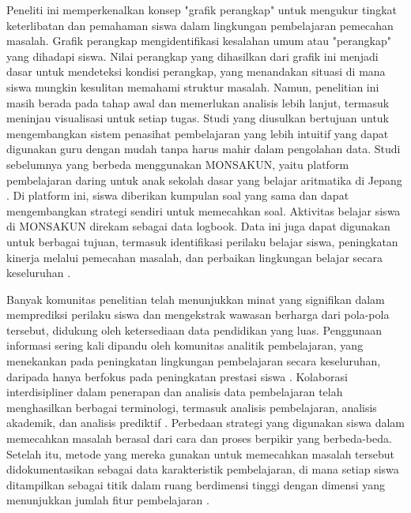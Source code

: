     Peneliti ini memperkenalkan konsep "grafik perangkap" untuk mengukur tingkat keterlibatan dan pemahaman siswa dalam lingkungan pembelajaran pemecahan masalah. Grafik perangkap mengidentifikasi kesalahan umum atau "perangkap" yang dihadapi siswa. Nilai perangkap yang dihasilkan dari grafik ini menjadi dasar untuk mendeteksi kondisi perangkap, yang menandakan situasi di mana siswa mungkin kesulitan memahami struktur masalah. Namun, penelitian ini masih berada pada tahap awal dan memerlukan analisis lebih lanjut, termasuk meninjau visualisasi untuk setiap tugas. Studi yang diusulkan bertujuan untuk mengembangkan sistem penasihat pembelajaran yang lebih intuitif yang dapat digunakan guru dengan mudah tanpa harus mahir dalam pengolahan data. Studi sebelumnya yang berbeda menggunakan MONSAKUN, yaitu platform pembelajaran daring untuk anak sekolah dasar yang belajar aritmatika di Jepang \citep{Hirashima2014}. Di platform ini, siswa diberikan kumpulan soal yang sama dan dapat mengembangkan strategi sendiri untuk memecahkan soal. Aktivitas belajar siswa di MONSAKUN direkam sebagai data logbook. Data ini juga dapat digunakan untuk berbagai tujuan, termasuk identifikasi perilaku belajar siswa, peningkatan kinerja melalui pemecahan masalah, dan perbaikan lingkungan belajar secara keseluruhan \citep{Supianto2016}.
    
    Banyak komunitas penelitian telah menunjukkan minat yang signifikan dalam memprediksi perilaku siswa dan mengekstrak wawasan berharga dari pola-pola tersebut, didukung oleh ketersediaan data pendidikan yang luas. Penggunaan informasi sering kali dipandu oleh komunitas analitik pembelajaran, yang menekankan pada peningkatan lingkungan pembelajaran secara keseluruhan, daripada hanya berfokus pada peningkatan prestasi siswa \citep{Schumacher2018}. Kolaborasi interdisipliner dalam penerapan dan analisis data pembelajaran telah menghasilkan berbagai terminologi, termasuk analisis pembelajaran, analisis akademik, dan analisis prediktif \citep{Viberg2018}. Perbedaan strategi yang digunakan siswa dalam memecahkan masalah berasal dari cara dan proses berpikir yang berbeda-beda. Setelah itu, metode yang mereka gunakan untuk memecahkan masalah tersebut didokumentasikan sebagai data karakteristik pembelajaran, di mana setiap siswa ditampilkan sebagai titik dalam ruang berdimensi tinggi dengan dimensi yang menunjukkan jumlah fitur pembelajaran \citep{Kreuseler2002}.

